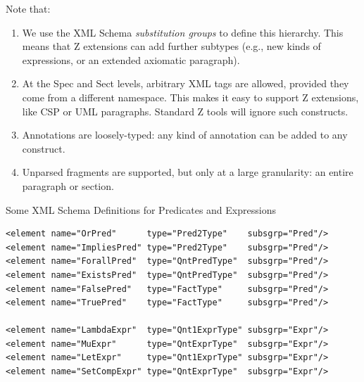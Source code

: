 \documentclass[%
   slidesonly,%
   semhelv,%
   landscape]{seminar}
\begin{document}
\begin{slide}
Note that:
\begin{enumerate}
  \item We use the XML Schema \emph{substitution groups} to define
    this hierarchy.   This means that Z extensions can add further subtypes
    (e.g., new kinds of expressions, or an extended axiomatic paragraph).
  \item At the Spec and Sect levels, arbitrary XML tags are allowed,
    provided they come from a different namespace.  This makes it
    easy to support Z extensions, like CSP or UML paragraphs.
    Standard Z tools will ignore such constructs.
  \item Annotations are loosely-typed: any kind of annotation can be added
    to any construct.
  \item Unparsed fragments are supported, but only at a large granularity:
    an entire paragraph or section. 
\end{enumerate}
\end{slide}

\begin{slide}
  \begin{center}
    \large Some XML Schema Definitions for Predicates and Expressions 
  \end{center}
\begin{footnotesize}
\begin{verbatim}
<element name="OrPred"      type="Pred2Type"    subsgrp="Pred"/>
<element name="ImpliesPred" type="Pred2Type"    subsgrp="Pred"/>
<element name="ForallPred"  type="QntPredType"  subsgrp="Pred"/>
<element name="ExistsPred"  type="QntPredType"  subsgrp="Pred"/>
<element name="FalsePred"   type="FactType"     subsgrp="Pred"/>
<element name="TruePred"    type="FactType"     subsgrp="Pred"/>

<element name="LambdaExpr"  type="Qnt1ExprType" subsgrp="Expr"/>
<element name="MuExpr"      type="QntExprType"  subsgrp="Expr"/>
<element name="LetExpr"     type="Qnt1ExprType" subsgrp="Expr"/>
<element name="SetCompExpr" type="QntExprType"  subsgrp="Expr"/>
\end{verbatim}
\end{footnotesize}
\end{slide}
\end{document}
